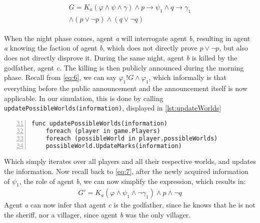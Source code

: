 \begin{align}
	\begin{split}
		G = K_a(\varphi \land \psi \land\gamma)\land p \rightarrow \psi_1 \land 
		q \rightarrow \gamma_1 \\ \land (p \lor \neg p) \land (q \lor \neg q) 
		\label{eq:7}
	\end{split}
\end{align}

When the night phase comes, agent \textit{a} will interrogate agent \textit{b}, 
resulting in agent \textit{a} knowing the faction of agent \textit{b}, which 
does not directly prove $p \lor \neg p$, but also does not directly disprove 
it. During the same night, agent \textit{b} is killed by the godfather, agent 
\textit{c}. The killing is then publicly announced during the morning phase. 
Recall from \cref{eq:6}, we can say $\varphi_1!G\land\varphi_1$, which 
informally is that everything before the public announcement and the 
announcement itself is now applicable. In our simulation, this is done by 
calling \lstinline[]{updatePossibleWorlds(information)}, displayed in 
\ref{lst:updateWorlds} 
\begin{lstlisting}[basicstyle=\footnotesize\ttfamily, numbers=left, 
xleftmargin=0.5cm, firstnumber=31, caption={Snippet from appendix C 
\label{lstlisting:2}}, captionpos=b]
	func updatePossibleWorlds(information)
	foreach (player in game.Players)
	foreach (possibleWorld in player.possibleWorlds)
	possibleWorld.UpdateMarks(information)
\end{lstlisting}\label{lst:updateWorld}
Which simply iterates over all players and all their respective worlds, and 
updates the information. Now recall back to \cref{eq:7}, after the newly 
acquired information of $\psi_1$, the role of agent \textit{b}, we can now 
simplify the expression, which results in:
\begin{align}
	G' = K_a(\varphi \land \psi_1 \land \neg \gamma_1) \land p \land \neg q
\end{align}
Agent \textit{a} can now infer that agent \textit{c} is the godfather, since he 
knows that he is not the sheriff, nor a villager, since agent \textit{b} was 
the only villager.
